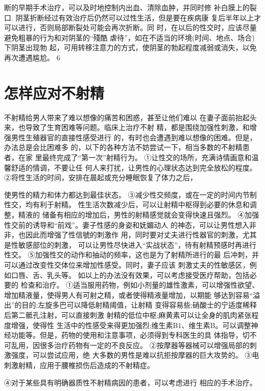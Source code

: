 \documentclass[12pt,UTF8]{ctexbook}
\begin{document}
断的早期手术治疗，可以及时地控制内出血、清除血肿，并同时修
补白膜上的裂口.
阴茎折断经过有效治疗后仍然可以过性生活，但是要在疾病康
复后半年以上才可以进行，否则局部断裂处可能会再次折断。同
时，在以后的性交时，应该尽量避免粗暴的行为和对阴茎的“殘酷
虐待”，如在不适当的环境(时间、地点、场合)下阴茎出现勃
起，可用转移注意力的方式，使阴茎的勃起程度减弱或消失，以免
再次遭遇尴尬。
6
\section{怎样应对不射精}
不射精给男人带来了难以想像的痛苦和困惑，甚至让他们难以
在妻子面前抬起头来，也导致了生育困难等问题。临床上治疗不射
精，都是围绕加强性刺激，和增强男性生殖器官的直接性感受进行
的，有时也会遭遇到难以想像的困难。但是，办法总是会比困难多
的，以下的各种方法不妨尝试一下，相当多数的不射精患者，在家
里最终完成了“第一次”射精行为。
①让性交的场所，充满诗情画意和温馨舒适的情调，不要让任
何人来打扰，让男性的心理状态达到完全放松的程度。
②将性生活的时间，安排在晨起或充分睡眠恢复了体力之后，

使男性的精力和体力都达到最佳状态。
③减少性交频度，或在一定的时间内节制性交，均有利于射精。
性生活次数减少后，可以让射精中枢得到必要的休息和调整，精液的
储备有相应的增加后，男性的射精感觉就会变得快速且强烈。
④加强性交前的诱导和“前戏”。妻子性感的身姿和妩媚动人
的神态，可以让男性想入非非，也因此而增强了性信號的刺激作
用，同时要对丈夫进行性器官的刺激，尤其是性敏感部位的刺激，
可以让男性尽快进入“实战状态”，待有射精预感时再进行性交。
⑤加强性交的动作和抽动的频率，这也是为了射精所进行的最
后冲刺，并可以通过改变性交体位来增加性感受。同时，妻子应该
刺激丈夫的性敏感区，例如口唇、舌、乳头等。
如以上的办法没有效果，可以考虑接受医疗帮助，包括必要的
检查和治疗。
①适当服用药物，例如小剂量的雄性激素，可以增强性欲望、
增加精液量，使得男人有可射之精，或者使得精液量增加，以期能
够达到容易“溢出”的目的;左旋多巴可以降低射精阈值，让射精
变得容易些;硝酸士的宁适度稀释后第二骶孔注射，可以直接刺激
射精的低位中枢;麻黄素可以让全身的肌肉紧张程度增强，使得性
生活中的性感受来得更加强烈;维生素B1、维生素B。可以调整神
经功能等。但是，药物的使用和注意事项，必须得到专科医生的具
体指导，切不可乱用，因很多治疗药物有一定的不良反应。
②按摩器等器械可以增强局部的刺激强度，可以尝试应用，绝
大多数的男性是难以抗拒按摩器的巨大攻势的。
③电刺激射精，应用于腰椎损伤后造成的不射精症。

④对于某些具有明确器质性不射精病因的患者，可以考虑进行
相应的手术治疗。
\end{document}
